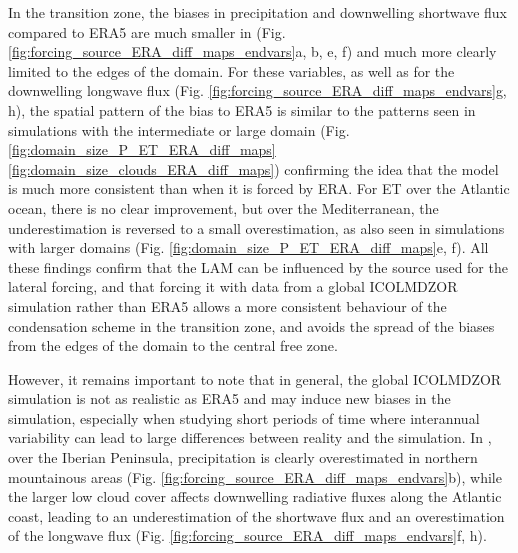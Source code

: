 \hfill

In the transition zone, the biases in precipitation and downwelling shortwave flux compared to ERA5 are much smaller in \forcingICO (Fig. \ref{fig:forcing_source_ERA_diff_maps_endvars}a, b, e, f) and much more clearly limited to the edges of the domain. For these variables, as well as for the downwelling longwave flux (Fig. \ref{fig:forcing_source_ERA_diff_maps_endvars}g, h), the spatial pattern of the bias to ERA5 is similar to the patterns seen in simulations with the intermediate or large domain (Fig. \ref{fig:domain_size_P_ET_ERA_diff_maps} \ref{fig:domain_size_clouds_ERA_diff_maps}) confirming the idea that the model is much more consistent than when it is forced by ERA. 
For ET over the Atlantic ocean, there is no clear improvement, but over the Mediterranean, the underestimation is reversed to a small overestimation, as also seen in simulations with larger domains (Fig. \ref{fig:domain_size_P_ET_ERA_diff_maps}e, f).
All these findings confirm that the LAM can be influenced by the source used for the lateral forcing, and that forcing it with data from a global ICOLMDZOR simulation rather than ERA5 allows a more consistent behaviour of the condensation scheme in the transition zone, and avoids the spread of the biases from the edges of the domain to the central free zone.

\hfill

However, it remains important to note that in general, the global ICOLMDZOR simulation is not as realistic as ERA5 and may induce new biases in the simulation, especially when studying short periods of time where interannual variability can lead to large differences between reality and the simulation. 
In \forcingICO, over the Iberian Peninsula, precipitation is clearly overestimated in northern mountainous areas (Fig. \ref{fig:forcing_source_ERA_diff_maps_endvars}b), while the larger low cloud cover affects downwelling radiative fluxes along the Atlantic coast, leading to an underestimation of the shortwave flux and an overestimation of the longwave flux (Fig. \ref{fig:forcing_source_ERA_diff_maps_endvars}f, h).

